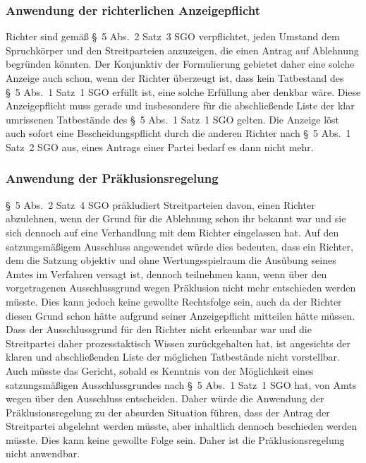 \subsubsection{Anwendung der richterlichen Anzeigepflicht}
\label{Zusammensetzung:Spruchkoerper:Befangenheitsvermutung:Anzeigepflicht}
Richter sind gemäß \S~5 Abs.~2 Satz~3 SGO verpflichtet, jeden Umstand dem Spruchkörper und den Streitparteien anzuzeigen, die einen Antrag auf Ablehnung begründen könnten.
Der Konjunktiv der Formulierung gebietet daher eine solche Anzeige auch schon, wenn der Richter überzeugt ist, dass kein Tatbestand des \S~5 Abs.~1 Satz~1 SGO erfüllt ist, eine solche Erfüllung aber denkbar wäre.
Diese Anzeigepflicht muss gerade und insbesondere für die abschließende Liste der klar umrissenen Tatbestände des \S~5 Abs.~1 Satz~1 SGO gelten.
Die Anzeige löst auch sofort eine Bescheidungspflicht durch die anderen Richter nach \S~5 Abs.~1 Satz~2 SGO aus, eines Antrags einer Partei bedarf es dann nicht mehr.

\subsubsection{Anwendung der Präklusionsregelung}
\label{Zusammensetzung:Spruchkoerper:Befangenheitsvermutung:Praeklusion}
\S~5 Abs.~2 Satz~4 SGO präkludiert Streitparteien davon, einen Richter abzulehnen, wenn der Grund für die Ablehnung schon ihr bekannt war und sie sich dennoch auf eine Verhandlung mit dem Richter eingelassen hat.
Auf den satzungsmäßigem Ausschluss angewendet würde dies bedeuten, dass ein Richter, dem die Satzung objektiv und ohne Wertungsspielraum die Ausübung seines Amtes im Verfahren versagt ist, dennoch teilnehmen kann, wenn über den vorgetragenen Ausschlussgrund wegen Präklusion nicht mehr entschieden werden müsste.
Dies kann jedoch keine gewollte Rechtsfolge sein, auch da der Richter diesen Grund schon hätte aufgrund seiner Anzeigepflicht mitteilen hätte müssen.
Dass der Ausschlussgrund für den Richter nicht erkennbar war und die Streitpartei daher prozesstaktisch Wissen zurückgehalten hat, ist angesichts der klaren und abschließenden Liste der möglichen Tatbestände nicht vorstellbar.
Auch müsste das Gericht, sobald es Kenntnis von der Möglichkeit eines satzungsmäßigen Ausschlussgrundes nach \S~5 Abs.~1 Satz~1 SGO hat, von Amts wegen über den Ausschluss entscheiden.
Daher würde die Anwendung der Präklusionsregelung zu der absurden Situation führen, dass der Antrag der Streitpartei abgelehnt werden müsste, aber inhaltlich dennoch beschieden werden müsste.
Dies kann keine gewollte Folge sein.
Daher ist die Präklusionsregelung nicht anwendbar.


